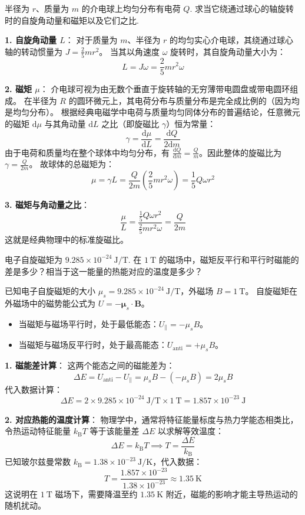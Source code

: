 \begin{exercise}\label{ex:19.5}
半径为 $r$、质量为 $m$ 的介电球上均匀分布有电荷 $Q$. 求当它绕通过球心的轴旋转时的自旋角动量和磁矩以及它们之比.
\end{exercise}
\begin{solution}
\textbf{1. 自旋角动量 $L$}：
对于质量为 $m$、半径为 $r$ 的均匀实心介电球，其绕通过球心轴的转动惯量为 $J = \frac{2}{5} m r^2$。
当其以角速度 $\omega$ 旋转时，其自旋角动量大小为：
$$ L = J \omega = \frac{2}{5} m r^2 \omega $$

\textbf{2. 磁矩 $\mu$}：
介电球可视为由无数个垂直于旋转轴的无穷薄带电圆盘或带电圆环组成。
在半径为 $R$ 的圆环微元上，其电荷分布与质量分布是完全成比例的（因为均是均匀分布）。
根据经典电磁学中电荷与质量均匀同体分布的普遍结论，任意微元的磁矩 $\mathrm{d}\mu$ 与其角动量 $\mathrm{d}L$ 之比（即旋磁比 $\gamma$）恒为常量：
$$ \gamma = \frac{\mathrm{d}\mu}{\mathrm{d}L} = \frac{\mathrm{d}Q}{2 \mathrm{d}m} $$
由于电荷和质量均在整个球体中均匀分布，有 $\frac{\mathrm{d}Q}{\mathrm{d}m} = \frac{Q}{m}$。因此整体的旋磁比为 $\gamma = \frac{Q}{2m}$。
故球体的总磁矩为：
$$ \mu = \gamma L = \frac{Q}{2m} \left( \frac{2}{5} m r^2 \omega \right) = \frac{1}{5} Q \omega r^2 $$

\textbf{3. 磁矩与角动量之比}：
$$ \frac{\mu}{L} = \frac{\frac{1}{5} Q \omega r^2}{\frac{2}{5} m r^2 \omega} = \frac{Q}{2m} $$
这就是经典物理中的标准旋磁比。
\end{solution}

\begin{exercise}\label{ex:19.6}
电子自旋磁矩为 $9.285 \times 10^{-24} \ \mathrm{J/T}$. 在 $1 \ \mathrm{T}$ 的磁场中，磁矩反平行和平行时磁能的差是多少？相当于这一能量的热能对应的温度是多少？
\end{exercise}
\begin{solution}
已知电子自旋磁矩的大小 $\mu_s = 9.285 \times 10^{-24} \ \mathrm{J/T}$，外磁场 $B = 1 \ \mathrm{T}$。
自旋磁矩在外磁场中的磁势能公式为 $U = -\boldsymbol{\mu}_s \cdot \boldsymbol{B}$。
\begin{itemize}
    \item 当磁矩与磁场平行时，处于最低能态：$U_{\parallel} = -\mu_s B$。
    \item 当磁矩与磁场反平行时，处于最高能态：$U_{\text{anti}} = +\mu_s B$。
\end{itemize}

\textbf{1. 磁能差计算}：
这两个能态之间的磁能差为：
$$ \Delta E = U_{\text{anti}} - U_{\parallel} = \mu_s B - (-\mu_s B) = 2 \mu_s B $$
代入数据计算：
$$ \Delta E = 2 \times 9.285 \times 10^{-24} \ \mathrm{J/T} \times 1 \ \mathrm{T} = 1.857 \times 10^{-23} \ \mathrm{J} $$

\textbf{2. 对应热能的温度计算}：
物理学中，通常将特征能量标度与热力学能态相类比，令热运动特征能量 $k_{\mathrm{B}} T$ 等于该能量差 $\Delta E$ 以求解等效温度：
$$ \Delta E = k_{\mathrm{B}} T \implies T = \frac{\Delta E}{k_{\mathrm{B}}} $$
已知玻尔兹曼常数 $k_{\mathrm{B}} = 1.38 \times 10^{-23} \ \mathrm{J/K}$，代入数据：
$$ T = \frac{1.857 \times 10^{-23}}{1.38 \times 10^{-23}} \approx 1.35 \ \mathrm{K} $$
这说明在 $1 \ \mathrm{T}$ 磁场下，需要降温至约 $1.35 \ \mathrm{K}$ 附近，磁能的影响才能主导热运动的随机扰动。
\end{solution}

